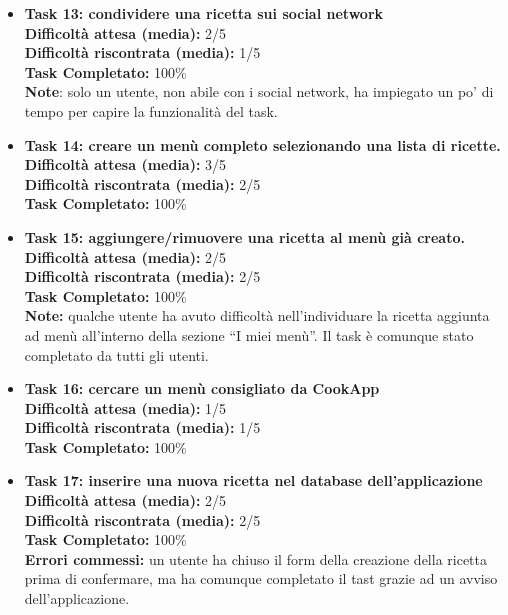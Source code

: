\begin{itemize}
\item
\textbf{Task 13: condividere una ricetta sui social network}\\
\textbf{Difficoltà attesa (media):} 2/5\\
\textbf{Difficoltà riscontrata (media):} 1/5\\
\textbf{Task Completato:} 100\%\\
\textbf{Note}: solo un utente, non abile con i social network, ha
impiegato un po' di tempo per capire la funzionalità del task.\\

\item
\textbf{Task 14: creare un menù completo selezionando una lista di
ricette.}\\
\textbf{Difficoltà attesa (media):} 3/5\\
\textbf{Difficoltà riscontrata (media):} 2/5\\
\textbf{Task Completato:} 100\%\\

\item
\textbf{Task 15: aggiungere/rimuovere una ricetta al menù già creato.}\\
\textbf{Difficoltà attesa (media):} 2/5\\
\textbf{Difficoltà riscontrata (media):} 2/5\\
\textbf{Task Completato:} 100\%\\
\textbf{Note:} qualche utente ha avuto difficoltà nell'individuare la
ricetta aggiunta ad menù all'interno della sezione ``I miei menù''. Il
task è comunque stato completato da tutti gli utenti.\\

\item
\textbf{Task 16: cercare un menù consigliato da CookApp}\\
\textbf{Difficoltà attesa (media):} 1/5\\
\textbf{Difficoltà riscontrata (media):} 1/5\\
\textbf{Task Completato:} 100\%\\

\item
\textbf{Task 17: inserire una nuova ricetta nel database
dell'applicazione}\\
\textbf{Difficoltà attesa (media):} 2/5\\
\textbf{Difficoltà riscontrata (media):} 2/5\\
\textbf{Task Completato:} 100\%\\
\textbf{Errori commessi:} un utente ha chiuso il form della creazione
della ricetta prima di confermare, ma ha comunque completato il tast
grazie ad un avviso dell'applicazione.\\


\end{itemize}
